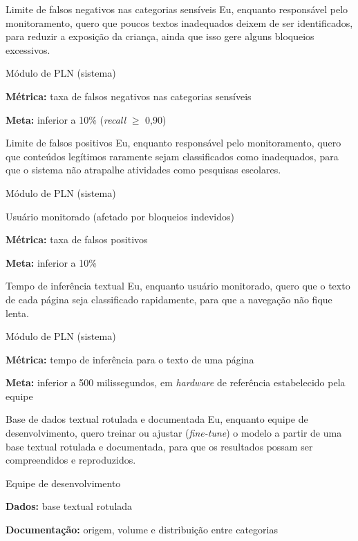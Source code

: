 \documentclass[
    12pt,           %
    oneside,        %
    a4paper,        %
    chapter=TITLE,  %
    english,        %
    brazil          %
]{abntex2}
\begin{document}
{Limite de falsos negativos nas categorias sensíveis}
{Eu, enquanto responsável pelo monitoramento, quero que poucos textos inadequados deixem de ser identificados, para reduzir a exposição da criança, ainda que isso gere alguns bloqueios excessivos.}
{\begin{dadoslista}
\item Módulo de PLN (sistema)
\end{dadoslista}}
{\begin{dadoslista}
\item \textbf{Métrica:} taxa de falsos negativos nas categorias sensíveis
\item \textbf{Meta:} inferior a 10\% (\textit{recall} $\geq$ 0,90)
\end{dadoslista}}

{Limite de falsos positivos}
{Eu, enquanto responsável pelo monitoramento, quero que conteúdos legítimos raramente sejam classificados como inadequados, para que o sistema não atrapalhe atividades como pesquisas escolares.}
{\begin{dadoslista}
\item Módulo de PLN (sistema)
\item Usuário monitorado (afetado por bloqueios indevidos)
\end{dadoslista}}
{\begin{dadoslista}
\item \textbf{Métrica:} taxa de falsos positivos
\item \textbf{Meta:} inferior a 10\%
\end{dadoslista}}

{Tempo de inferência textual}
{Eu, enquanto usuário monitorado, quero que o texto de cada página seja classificado rapidamente, para que a navegação não fique lenta.}
{\begin{dadoslista}
\item Módulo de PLN (sistema)
\end{dadoslista}}
{\begin{dadoslista}
\item \textbf{Métrica:} tempo de inferência para o texto de uma página
\item \textbf{Meta:} inferior a 500 milissegundos, em \textit{hardware} de referência estabelecido pela equipe
\end{dadoslista}}

{Base de dados textual rotulada e documentada}
{Eu, enquanto equipe de desenvolvimento, quero treinar ou ajustar (\textit{fine-tune}) o modelo a partir de uma base textual rotulada e documentada, para que os resultados possam ser compreendidos e reproduzidos.}
{\begin{dadoslista}
\item Equipe de desenvolvimento
\end{dadoslista}}
{\begin{dadoslista}
\item \textbf{Dados:} base textual rotulada
\item \textbf{Documentação:} origem, volume e distribuição entre categorias
\end{dadoslista}}
\end{document}
